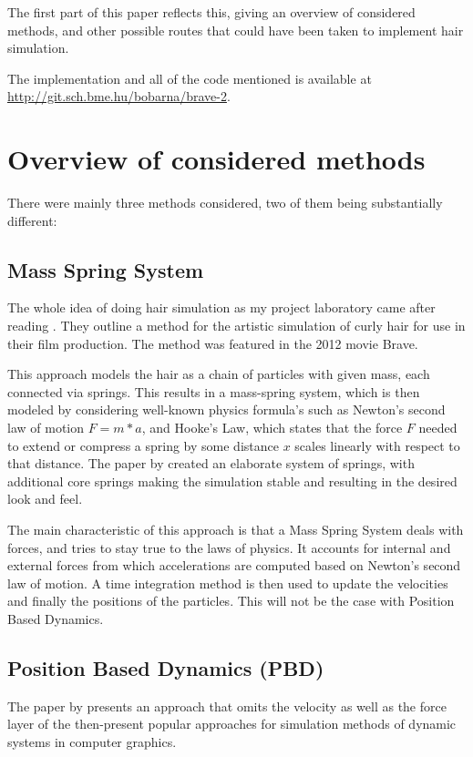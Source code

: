 \documentclass[sigplan,screen,nonacm]{acmart}
\begin{document}
The first part of this paper reflects this, giving an overview of considered
methods, and other possible routes that could have been taken to implement hair
simulation.


The implementation and all of the code mentioned is available at
\url{http://git.sch.bme.hu/bobarna/brave-2}.

\section{Overview of considered methods}

There were mainly three methods considered, two of them being substantially
different:


\subsection{Mass Spring System}
The whole idea of doing hair simulation as my project laboratory came after
reading \citet{PixarPaper}. They outline a method for the artistic simulation of
curly hair for use in their film production. The method was featured in the 2012
movie Brave.

This approach models the hair as a chain of particles with given mass, each
connected via springs. This results in a mass-spring system, which is then
modeled by considering well-known physics formula's such as Newton's second law
of motion $F=m*a$, and Hooke's Law, which states that the force $F$
needed to extend or compress a spring by some distance $x$ scales linearly with
respect to that distance. The paper by \citet{PixarPaper} created an elaborate
system of springs, with additional core springs making the simulation stable
and resulting in the desired look and feel.

The main characteristic of this approach is that a Mass Spring System deals with
forces, and tries to stay true to the laws of physics. It accounts for internal 
and external forces from which accelerations are computed based on Newton's 
second law of motion. A time integration method is then used to update the
velocities and finally the positions of the particles. This will not be the case
with Position Based Dynamics.
\subsection{Position Based Dynamics (PBD)}

The paper by \citet{MullerPBD} presents an approach that omits the velocity as
well as the force layer of the then-present popular approaches for simulation
methods of dynamic systems in computer graphics.
\end{document}
